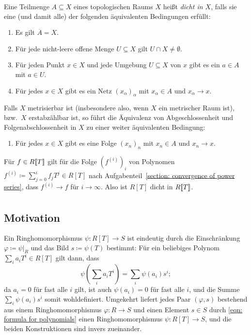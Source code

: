 \documentclass[a4paper, 10pt, numbers=noenddot]{scrartcl}
\begin{document}
\begin{recall}
  Eine Teilmenge $A \subseteq X$ eines topologischen Raums $X$ heißt \emph{dicht in $X$}, falls sie eine (und damit alle) der folgenden äquivalenten Bedingungen erfüllt:
  \begin{enumerate}
    \item
      Es gilt $\overline{A} = X$.
    \item
      Für jede nicht-leere offene Menge $U \subseteq X$ gilt $U \cap X \neq \emptyset$.
    \item
      Für jeden Punkt $x \in X$ und jede Umgebung $U \subseteq X$ von $x$ gibt es ein $a \in A$ mit $a \in U$.
    \item
      Für jedes $x \in X$ gibt es ein Netz $(x_\alpha)_\alpha$ mit $x_\alpha \in A$ und $x_\alpha \to x$.
  \end{enumerate}
  Falls $X$ metrisierbar ist (insbesondere also, wenn $X$ ein metrischer Raum ist), bzw.\ $X$ erstabzählbar ist, so führt die Äquivalenz von Abgeschlossenheit und Folgenabschlossenheit in $X$ zu einer weiter äquivalenten Bedingung:
  \begin{enumerate}[resume]
    \item
      Für jedes $x \in X$ gibt es eine Folge $(x_n)_n$ mit $x_n \in A$ und $x_n \to x$.
  \end{enumerate}
\end{recall}


Für $f \in R[\![T]\!]$ gilt für die Folge $(f^{(i)})_i$ von Polynomen $f^{(i)} \coloneqq \sum_{j=0}^i f_j T^j \in R[T]$ nach Aufgabenteil~\ref{section: convergence of power series}, dass $f^{(i)} \to f$ für $i \to \infty$.
Also ist $R[T]$ dicht in $R[\![T]\!]$.





\section{}



\subsection*{Motivation}

Ein Ringhomomorphismus $\psi \colon R[T] \to S$ ist eindeutig durch die Einschränkung $\varphi \coloneqq \psi|_R$ und das Bild $s \coloneqq \psi(T)$ bestimmt:
Für ein beliebiges Polynom $\sum_i a_i T^i \in R[T]$ gilt dann, dass
\begin{equation}
  \label{eqn: formula for polynomials}
    \psi\left( \sum_i a_i T^i \right)
  = \sum_i \psi(a_i) s^i;
\end{equation}
da $a_i = 0$ für fast alle $i$ gilt, ist auch $\psi(a_i) = 0$ für fast alle $i$, und die Summe $\sum_i \psi(a_i) s^i$ somit wohldefiniert.
Umgekehrt liefert jedes Paar $(\varphi, s)$ bestehend aus einem Ringhomomorphismus $\varphi \colon R \to S$ und einen Element $s \in S$ durch \eqref{eqn: formula for polynomials} einen Ringhomomorphismus $\psi \colon R[T] \to S$, und die beiden Konstruktionen sind invers zueinander.
\end{document}
